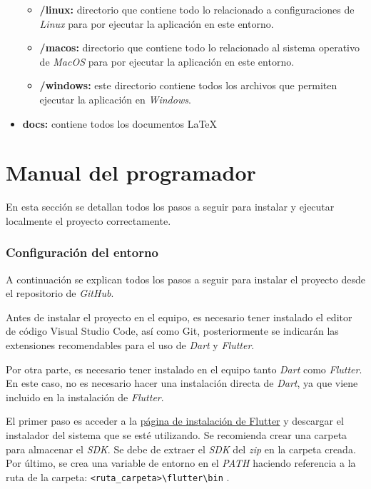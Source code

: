 \begin{itemize}
\begin{itemize}
\begin{itemize}
            \end{itemize}
            \item \textbf{/linux:} directorio que contiene todo lo relacionado a configuraciones de \textit{Linux} para por ejecutar la aplicación en este entorno.
            \item \textbf{/macos:} directorio que contiene todo lo relacionado al sistema operativo de \textit{MacOS} para por ejecutar la aplicación en este entorno.
            \item \textbf{/windows:} este directorio contiene todos los archivos que permiten ejecutar la aplicación en \textit{Windows}.
        \end{itemize}
    \item \textbf{docs:} contiene todos los documentos \LaTeX 
\end{itemize}

\section{Manual del programador}
En esta sección se detallan todos los pasos a seguir para instalar y ejecutar localmente el proyecto correctamente.

\subsubsection{Configuración del entorno}
A continuación se explican todos los pasos a seguir para instalar el proyecto desde el repositorio de \textit{GitHub}.

Antes de instalar el proyecto en el equipo, es necesario tener instalado el editor de código Visual Studio Code, así como Git, posteriormente se indicarán las extensiones recomendables para el uso de \textit{Dart} y \textit{Flutter}.

Por otra parte, es necesario tener instalado en el equipo tanto \textit{Dart} como \textit{Flutter}. En este caso, no es necesario hacer una instalación directa de \textit{Dart}, ya que viene incluido en la instalación de \textit{Flutter}.

El primer paso es acceder a la \href{https://docs.flutter.dev/install/manual}{página de instalación de Flutter} y descargar el instalador del sistema que se esté utilizando. Se recomienda crear una carpeta para almacenar el \textit{SDK}. Se debe de extraer el \textit{SDK} del \textit{zip} en la carpeta creada. Por último, se crea una variable de entorno en el \textit{PATH} haciendo referencia a la ruta de la carpeta: \verb|<ruta_carpeta>\flutter\bin| \cite{flutter_instalacion}.

